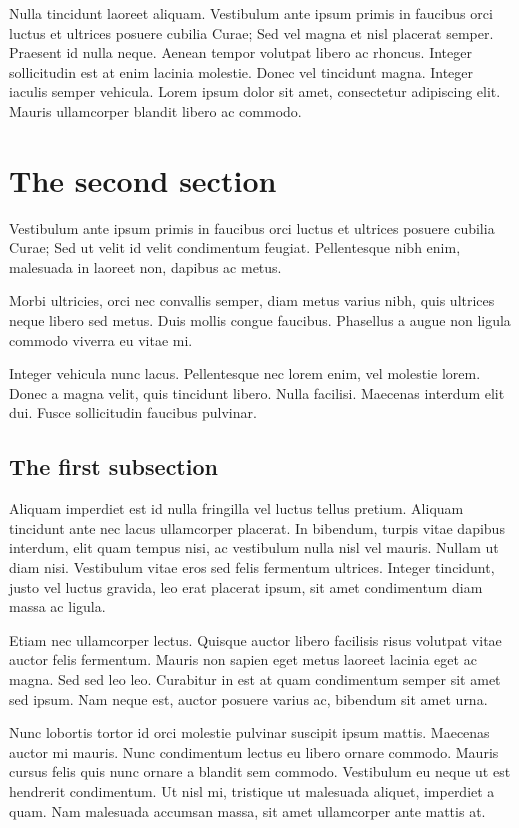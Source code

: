 Nulla tincidunt laoreet aliquam. Vestibulum ante ipsum primis in faucibus orci luctus et ultrices posuere cubilia Curae; Sed vel magna et nisl placerat semper. Praesent id nulla neque. Aenean tempor volutpat libero ac rhoncus. Integer sollicitudin est at enim lacinia molestie. Donec vel tincidunt magna. Integer iaculis semper vehicula. Lorem ipsum dolor sit amet, consectetur adipiscing elit. Mauris ullamcorper blandit libero ac commodo.


\section{The second section}
\label{ch7:second}
Vestibulum ante ipsum primis in faucibus orci luctus et ultrices posuere cubilia Curae; Sed ut velit id velit condimentum feugiat. Pellentesque nibh enim, malesuada in laoreet non, dapibus ac metus. 

Morbi ultricies, orci nec convallis semper, diam metus varius nibh, quis ultrices neque libero sed metus. Duis mollis congue faucibus. Phasellus a augue non ligula commodo viverra eu vitae mi. 

Integer vehicula nunc lacus. Pellentesque nec lorem enim, vel molestie lorem. Donec a magna velit, quis tincidunt libero. Nulla facilisi. Maecenas interdum elit dui. Fusce sollicitudin faucibus pulvinar.

\subsection{The first subsection}
\label{ch7:second:a}
Aliquam imperdiet est id nulla fringilla vel luctus tellus pretium. Aliquam tincidunt ante nec lacus ullamcorper placerat. In bibendum, turpis vitae dapibus interdum, elit quam tempus nisi, ac vestibulum nulla nisl vel mauris. Nullam ut diam nisi. Vestibulum vitae eros sed felis fermentum ultrices. Integer tincidunt, justo vel luctus gravida, leo erat placerat ipsum, sit amet condimentum diam massa ac ligula. 

Etiam nec ullamcorper lectus. Quisque auctor libero facilisis risus volutpat vitae auctor felis fermentum. Mauris non sapien eget metus laoreet lacinia eget ac magna. Sed sed leo leo. Curabitur in est at quam condimentum semper sit amet sed ipsum. Nam neque est, auctor posuere varius ac, bibendum sit amet urna. 

Nunc lobortis tortor id orci molestie pulvinar suscipit ipsum mattis. Maecenas auctor mi mauris. Nunc condimentum lectus eu libero ornare commodo. Mauris cursus felis quis nunc ornare a blandit sem commodo. Vestibulum eu neque ut est hendrerit condimentum. Ut nisl mi, tristique ut malesuada aliquet, imperdiet a quam. Nam malesuada accumsan massa, sit amet ullamcorper ante mattis at.

